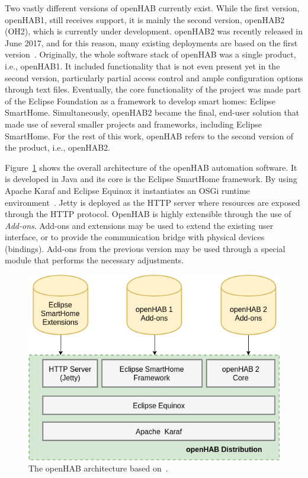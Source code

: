\documentclass[12pt]{article}
\begin{document}
Two vastly different versions of openHAB currently exist. While the first version, openHAB1, still receives support, it is mainly the second version, openHAB2 (OH2), which is currently under development. openHAB2 was recently released in June 2017, and for this reason, many existing deployments are based on the first version~\cite{openhab_01}. Originally, the whole software stack of openHAB was a single product, i.e., openHAB1. It included functionality that is not even present yet in the second version, particularly partial access control and ample configuration options through text files. Eventually, the core functionality of the project was made part of the Eclipse Foundation as a framework to develop smart homes: Eclipse SmartHome. Simultaneously, openHAB2 became the final, end-user solution that made use of several smaller projects and frameworks, including Eclipse SmartHome. For the rest of this work, openHAB refers to the second version of the product, i.e., openHAB2.

Figure~\ref{fig:oh_architecture} shows the overall architecture of the openHAB automation software. It is developed in Java and its core is the Eclipse SmartHome framework. By using Apache Karaf and Eclipse Equinox it instantiates an OSGi runtime environment~\cite{openhab_02}. Jetty is deployed as the HTTP server where resources are exposed through the HTTP protocol. OpenHAB is highly extensible through the use of \emph{Add-ons}. Add-ons and extensions may be used to extend the existing user interface, or to provide the communication bridge with physical devices (bindings). Add-ons from the previous version may be used through a special module that performs the necessary adjustments. 

\begin{figure} [ht] 
\begin{center}
\includegraphics[width=\textwidth]{oh_architecture}
\caption{The openHAB architecture based on~\cite{openhab_02}.}
\label{fig:oh_architecture}
\end{center}
\end{figure}
\end{document}
